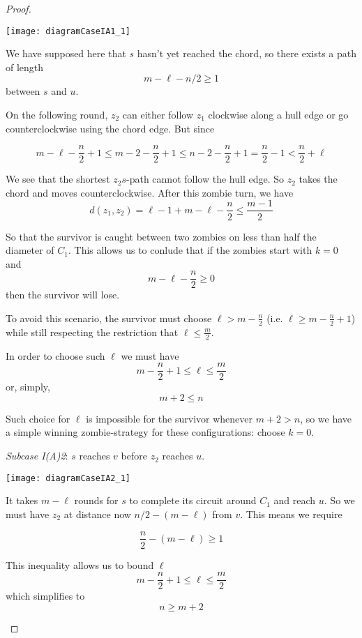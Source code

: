 \documentclass[letterpaper, 10pt]{article}
\begin{document}
\begin{proof}
\begin{proofpart}
\begin{center}
\texttt{[image: diagramCaseIA1\_1]}
\end{center}

We have supposed here that $s$ hasn't yet reached the chord, so there exists a path of length
\[m - \ell -n/2 \geq 1 \]
between $s$ and $u$.

On the following round, $z_2$ can either follow $z_1$ clockwise along a hull edge or go
counterclockwise using the chord edge. But since

\[ m - \ell - \frac{n}{2} +1 \leq m - 2 -\frac{n}{2}  +1 \leq n - 2 - \frac{n}{2} +1 = \frac{n}{2} -1 < \frac{n}{2} + \ell\]

We see that the shortest $z_2s$-path cannot follow the hull edge.
So $z_2$ takes the chord and moves counterclockwise.
After this zombie turn, we have
\[d(z_1, z_2) = \ell - 1 + m - \ell - \frac{n}{2} \leq \frac{m-1}{2}\]

So that the survivor is caught between two zombies on less than half the diameter of $C_1$.
This allows us to conlude that if the zombies start with $k=0$ and
\[ m - \ell -\frac{n}{2}  \geq 0 \]
then the survivor will lose.

To avoid this scenario, the survivor must choose $\ell > m - \frac{n}{2}$
(i.e. $\ell \geq m - \frac{n}{2} +1$)
while still respecting the restriction that $\ell \leq \frac{m}{2}$.

In order to choose such $\ell$ we must have
\[ m - \frac{n}{2} +1 \leq \ell \leq \frac{m}{2} \]
or, simply,
\[ m + 2 \leq n \]

Such choice for $\ell$ is impossible for the survivor whenever
$m+2 > n$, so we have a simple winning zombie-strategy for these configurations:
choose $k=0$.

\emph{Subcase I(A)2}: $s$ reaches $v$ before $z_2$ reaches $u$.

\begin{center}
\texttt{[image: diagramCaseIA2\_1]}
\end{center}

It takes $m-\ell$ rounds for $s$ to complete its circuit around $C_1$ and reach $u$. So
we must have $z_2$ at distance now $n/2 - (m-\ell)$ from $v$. This means we require

\[ \frac{n}{2} - (m-\ell) \geq 1 \]

This inequality allows us to bound $\ell$
\[ m - \frac{n}{2} +1 \leq \ell \leq \frac{m}{2}\]
which simplifies to
\[ n \geq m+2 \]


\end{proofpart}
\end{proof}
\end{document}
